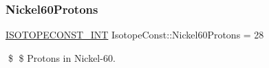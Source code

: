 \subsubsection{\texorpdfstring{Nickel60\+Protons}{Nickel60Protons}}
{\footnotesize\ttfamily \mbox{\hyperlink{group___isotope_const-_macros_ga5f18360b3e99483a35c32d789e62621c}{I\+S\+O\+T\+O\+P\+E\+C\+O\+N\+S\+T\+\_\+\+I\+NT}} Isotope\+Const\+::\+Nickel60\+Protons = 28}

\$ \$ Protons in Nickel-\/60. 
